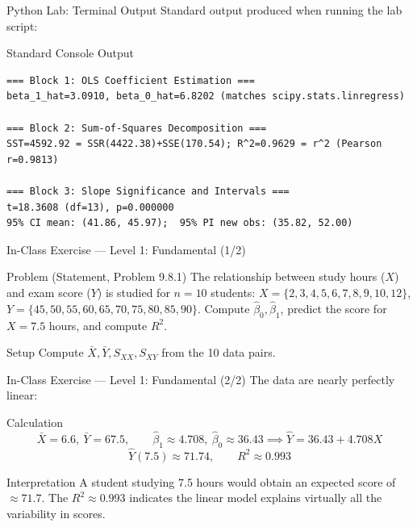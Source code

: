 \documentclass[10pt, aspectratio=169]{beamer}
\begin{document}
\begin{frame}[fragile]{Python Lab: Terminal Output}
  \scriptsize
  Standard output produced when running the lab script:
  \vspace{0.02cm}
  \begin{block}{Standard Console Output}
    \fontsize{3.8pt}{4.6pt}\selectfont
    \begin{verbatim}
=== Block 1: OLS Coefficient Estimation ===
beta_1_hat=3.0910, beta_0_hat=6.8202 (matches scipy.stats.linregress)

=== Block 2: Sum-of-Squares Decomposition ===
SST=4592.92 = SSR(4422.38)+SSE(170.54); R^2=0.9629 = r^2 (Pearson r=0.9813)

=== Block 3: Slope Significance and Intervals ===
t=18.3608 (df=13), p=0.000000
95% CI mean: (41.86, 45.97);  95% PI new obs: (35.82, 52.00)
    \end{verbatim}
  \end{block}
\end{frame}

\begin{frame}{In-Class Exercise --- Level 1: Fundamental (1/2)}
  \footnotesize
  \begin{block}{Problem (Statement, Problem 9.8.1)}
    The relationship between study hours ($X$) and exam score ($Y$) is studied for $n=10$ students: $X=\{2,3,4,5,6,7,8,9,10,12\}$, $Y=\{45,50,55,60,65,70,75,80,85,90\}$. Compute $\hat\beta_0,\hat\beta_1$, predict the score for $X=7.5$ hours, and compute $R^2$.
  \end{block}

  \vspace{0.15cm}
  \pause
  \begin{alertblock}{Setup}
    Compute $\bar X,\bar Y,S_{XX},S_{XY}$ from the 10 data pairs.
  \end{alertblock}
\end{frame}

\begin{frame}{In-Class Exercise --- Level 1: Fundamental (2/2)}
  \scriptsize
  The data are nearly perfectly linear: \pause

  \vspace{0.05cm}
  \begin{block}{Calculation}
    $$\bar X=6.6,\ \bar Y=67.5, \qquad \hat\beta_1\approx4.708,\ \hat\beta_0\approx36.43 \implies \hat Y=36.43+4.708X$$
    $$\hat Y(7.5)\approx71.74, \qquad R^2\approx0.993$$
  \end{block}

  \vspace{0.05cm}
  \pause
  \begin{alertblock}{Interpretation}
    A student studying 7.5 hours would obtain an expected score of $\approx71.7$. The $R^2\approx0.993$ indicates the linear model explains virtually all the variability in scores.
  \end{alertblock}
\end{frame}
\end{document}
